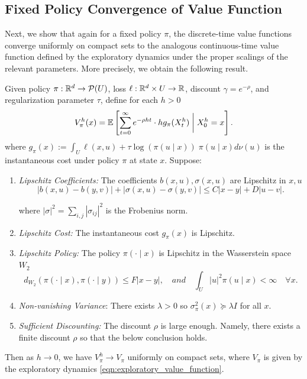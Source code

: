 \subsection{Fixed Policy Convergence of Value Function}
\noindent Next, we show that again for a fixed policy $\pi$, the discrete-time value functions converge uniformly on compact sets
to the analogous continuous-time value function defined by the exploratory dynamics under the proper scalings of the relevant parameters. More precisely, we obtain the following result.
%
\begin{lemma}
\label{lem:convergence_of_value_functions}
	Given policy $\pi: \mathbb{R}^d \to \mathcal{P}(U)$, loss $\ell: \mathbb{R}^d \times U \to \mathbb{R}$, discount $\gamma = e^{-\rho}$, and regularization parameter $\tau$, define for each $h > 0$
	\[V^h_\pi(x) = \mathbb{E}\left[ \sum_{t=0}^\infty e^{-\rho h t} \cdot h g_\pi(X^h_t)\;\bigg\vert\; X^h_0 = x\right].\]
	\noindent where $g_\pi(x) := \int_U \ell(x, u) + \tau \log(\pi(u \mid x)) \; \pi(u \mid x) d\nu(u)$ is the instantaneous cost under policy $\pi$ at state $x$.
	\noindent Suppose: 

	\begin{enumerate}[label=(\roman*)]
		\item \textit{Lipschitz Coefficients:} The coefficients $b(x, u), \sigma(x,u)$ are Lipschitz in $x,u$
		       \[|b(x,u) - b(y,v)| + |\sigma(x,u) - \sigma(y,v)|  \leq C |x-y| + D |u-v|.\]

			   \noindent where $|\sigma|^2 = \sum_{i,j} |\sigma_{ij}|^2$ is the Frobenius norm.
		\item \textit{Lipschitz Cost:} The instantaneous cost $g_\pi(x)$ is Lipschitz.
		\item \textit{Lipschitz Policy:} The policy $\pi(\cdot \mid x)$ is Lipschitz in the Wasserstein space $W_2$
				\[d_{W_2}(\pi(\cdot \mid x), \pi(\cdot \mid y)) \leq F |x-y|, \quad and \quad \int_U |u|^2 \pi(u \mid x) < \infty \quad \forall x.\]
		\item \textit{Non-vanishing Variance}: There exists $\lambda > 0$ so $\sigma_\pi^2(x) \succeq \lambda I$ for all $x$.


		\item \textit{Sufficient Discounting:} The discount $\rho$ is large enough. Namely, there exists a finite discount $\rho$ so that the below conclusion holds.


	\end{enumerate}

	\noindent Then as $h \to 0$, we have $V^h_\pi \to V_\pi$ uniformly on compact sets, where $V_\pi$ is given by the exploratory dynamics \eqref{eqn:exploratory_value_function}.
\end{lemma}

